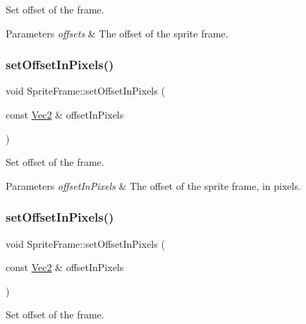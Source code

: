 Set offset of the frame.


\begin{DoxyParams}{Parameters}
{\em offsets} & The offset of the sprite frame. \\
\hline
\end{DoxyParams}
\mbox{\label{classSpriteFrame_a4429cffc4fd0910e0d80b456a319162b}} 
\subsubsection{\texorpdfstring{set\+Offset\+In\+Pixels()}{setOffsetInPixels()}\hspace{0.1cm}{\footnotesize\ttfamily [1/2]}}
{\footnotesize\ttfamily void Sprite\+Frame\+::set\+Offset\+In\+Pixels (\begin{DoxyParamCaption}\item[{const \hyperlink{classVec2}{Vec2} \&}]{offset\+In\+Pixels }\end{DoxyParamCaption})}

Set offset of the frame.


\begin{DoxyParams}{Parameters}
{\em offset\+In\+Pixels} & The offset of the sprite frame, in pixels. \\
\hline
\end{DoxyParams}
\mbox{\label{classSpriteFrame_a4429cffc4fd0910e0d80b456a319162b}} 
\subsubsection{\texorpdfstring{set\+Offset\+In\+Pixels()}{setOffsetInPixels()}\hspace{0.1cm}{\footnotesize\ttfamily [2/2]}}
{\footnotesize\ttfamily void Sprite\+Frame\+::set\+Offset\+In\+Pixels (\begin{DoxyParamCaption}\item[{const \hyperlink{classVec2}{Vec2} \&}]{offset\+In\+Pixels }\end{DoxyParamCaption})}

Set offset of the frame.


